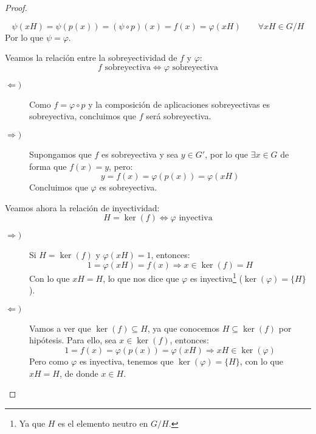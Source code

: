 \begin{teo}
\begin{proof}
\begin{itemize}
                \begin{equation*}
                    \psi(xH) = \psi(p(x)) = (\psi\circ p)(x) = f(x) = \varphi(xH) \qquad \forall xH\in G/H
                \end{equation*}
                Por lo que $\psi = \varphi$.
        \end{itemize}
        Veamos la relación entre la sobreyectividad de $f$ y $\varphi$:
        \begin{equation*}
            f \text{\ sobreyectiva} \Longleftrightarrow \varphi \text{\ sobreyectiva}
        \end{equation*}
        \begin{description}
            \item [$\Longleftarrow)$] Como $f = \varphi\circ p$ y la composición de aplicaciones sobreyectivas es sobreyectiva, concluimos que $f$ será sobreyectiva.
            \item [$\Longrightarrow)$] Supongamos que $f$ es sobreyectiva y sea $y\in G'$, por lo que $\exists x\in G$ de forma que $f(x) = y$, pero:
                \begin{equation*}
                    y = f(x) = \varphi(p(x)) = \varphi(xH)
                \end{equation*}
                Concluimos que $\varphi$ es sobreyectiva.
        \end{description}
        Veamos ahora la relación de inyectividad:
        \begin{equation*}
            H = \ker(f) \Longleftrightarrow \varphi \text{\ inyectiva}
        \end{equation*}
        \begin{description}
            \item [$\Longrightarrow)$] Si $H=\ker(f)$ y $\varphi(xH) = 1$, entonces:
                \begin{equation*}
                    1 = \varphi(xH) = f(x) \Longrightarrow x\in \ker(f) = H
                \end{equation*}
                Con lo que $xH = H$, lo que nos dice que $\varphi$ es inyectiva\footnote{Ya que $H$ es el elemento neutro en $G/H$.} ($\ker(\varphi)=\{H\}$).
            \item [$\Longleftarrow)$] Vamos a ver que $\ker(f) \subseteq H$, ya que conocemos $H\subseteq \ker(f)$ por hipótesis. Para ello, sea $x\in \ker(f)$, entonces:
                \begin{equation*}
                    1 = f(x) = \varphi(p(x)) = \varphi(xH) \Longrightarrow xH\in \ker(\varphi)
                \end{equation*}
                Pero como $\varphi$ es inyectiva, tenemos que $\ker(\varphi) = \{H\}$, con lo que $xH = H$, de donde $x\in H$.
        \end{description}
    \end{proof}
\end{teo}

